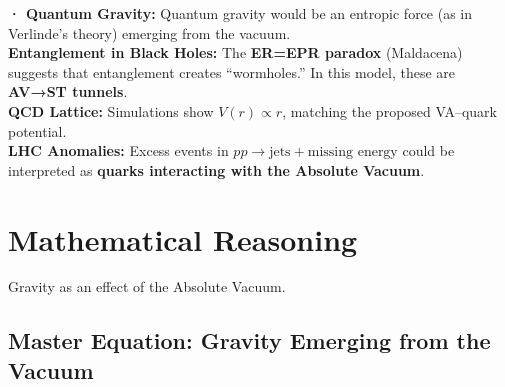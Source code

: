 \documentclass[a4paper]{article}
\theoremstyle{definition}
\theoremstyle{remark}
\numberwithin{equation}{section}
\begin{document}
\textbf{· Quantum Gravity:} Quantum gravity would be an entropic force (as in Verlinde's theory) emerging from the vacuum.\\

\textbf{Entanglement in Black Holes:} The \textbf{ER=EPR paradox} (Maldacena) \cite{Maldacena1998} suggests that entanglement creates ``wormholes.'' In this model, these are \textbf{AV→ST tunnels}.\\  

\textbf{QCD Lattice:} Simulations show \(V(r) \propto r\), matching the proposed VA–quark potential.\\

\textbf{LHC Anomalies:} Excess events in \(pp \to \text{jets} + \text{missing energy}\) could be interpreted as \textbf{quarks interacting with the Absolute Vacuum}.

	
\section{Mathematical Reasoning}

\begin{flushleft}
	Gravity as an effect of the Absolute Vacuum.
\end{flushleft}

\subsection{Master Equation: Gravity Emerging from the Vacuum}
\end{document}
